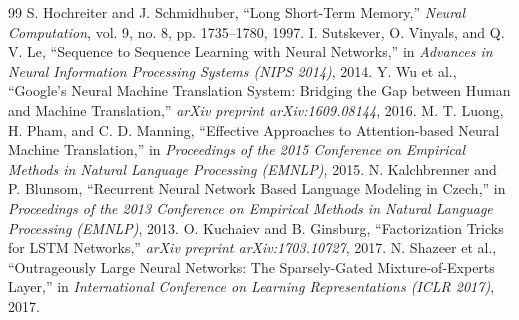 \documentclass[conference]{IEEEtran}
\begin{document}
\begin{thebibliography}{99}
 S. Hochreiter and J. Schmidhuber, ``Long Short-Term Memory,'' \textit{Neural Computation}, vol. 9, no. 8, pp. 1735--1780, 1997.
 I. Sutskever, O. Vinyals, and Q. V. Le, ``Sequence to Sequence Learning with Neural Networks,'' in \textit{Advances in Neural Information Processing Systems (NIPS 2014)}, 2014.
 Y. Wu et al., ``Google's Neural Machine Translation System: Bridging the Gap between Human and Machine Translation,'' \textit{arXiv preprint arXiv:1609.08144}, 2016.
 M. T. Luong, H. Pham, and C. D. Manning, ``Effective Approaches to Attention-based Neural Machine Translation,'' in \textit{Proceedings of the 2015 Conference on Empirical Methods in Natural Language Processing (EMNLP)}, 2015.
 N. Kalchbrenner and P. Blunsom, ``Recurrent Neural Network Based Language Modeling in Czech,'' in \textit{Proceedings of the 2013 Conference on Empirical Methods in Natural Language Processing (EMNLP)}, 2013.
 O. Kuchaiev and B. Ginsburg, ``Factorization Tricks for LSTM Networks,'' \textit{arXiv preprint arXiv:1703.10727}, 2017.
 N. Shazeer et al., ``Outrageously Large Neural Networks: The Sparsely-Gated Mixture-of-Experts Layer,'' in \textit{International Conference on Learning Representations (ICLR 2017)}, 2017.
\end{thebibliography}
\end{document}
